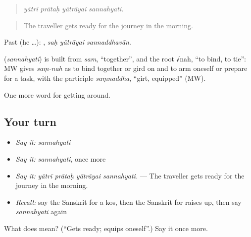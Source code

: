 \begin{quote}
   
\end{quote}

\begin{quote}
\emph{yātrī prātaḥ yātrāyai sannahyati.}
\end{quote}

\begin{quote}
The traveller gets ready for the journey in the morning.
\end{quote}

Past (he …):   , \emph{saḥ yātrāyai sannaddhavān}.

\begin{cousinweb}
\textbf{} (\emph{sannahyati}) is built from \emph{sam}, \textquotedblleft{}together\textquotedblright{}, and the root √nah, \textquotedblleft{}to bind, to tie\textquotedblright{}: MW gives \emph{saṃ-nah} as to bind together or gird on and to arm oneself or prepare for a task, with the participle \emph{saṃnaddha}, \textquotedblleft{}girt, equipped\textquotedblright{} (MW).
\end{cousinweb}

\begin{grammarlens}[title={What you've built}]
One more word for getting around.
\end{grammarlens}

\subsection*{Your turn}
\begin{itemize}
\raggedright
  \item \emph{Say it:} \emph{sannahyati}
  \item \emph{Say it:} \emph{sannahyati}, once more
  \item \emph{Say it:} \emph{yātrī prātaḥ yātrāyai sannahyati.} — The traveller gets ready for the journey in the morning.
  \item \emph{Recall:} say the Sanskrit for a kos, then the Sanskrit for raises up, then say \emph{sannahyati} again
\end{itemize}

\begin{tcolorbox}[breakable,colback=teal!4,colframe=teal!35!black,title={Before you move on}]
What does  mean? (\textquotedblleft{}Gets ready; equips oneself\textquotedblright{}.) Say it once more.
\end{tcolorbox}
